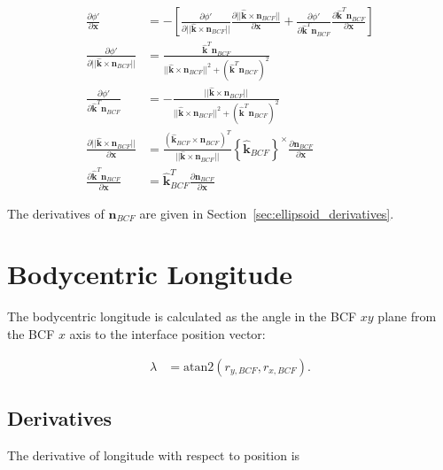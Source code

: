\documentclass[]{article}
\newcommand{\vb}[1]{\bm{#1}} %
\newcommand{\vbh}[1]{\hat{\bm{#1}}} %
\newcommand{\pd}[2]{\frac{\partial #1}{\partial #2}} %
\newcommand{\crossmat}[1]{\left\{ {#1} \right\}^{\times}} %
\begin{document}
\begin{align}
	\pd{\phi'}{\vb{x}} &= - \left[ \pd{\phi'}{|| \vbh{k} \times \vb{n}_{BCF} ||} \pd{|| \vbh{k} \times \vb{n}_{BCF} ||}{\vb{x}} + \pd{\phi'}{\vbh{k}^T \vb{n}_{BCF}} \pd{\vbh{k}^T \vb{n}_{BCF}}{\vb{x}} \right] \\
	\pd{\phi'}{|| \vbh{k} \times \vb{n}_{BCF} ||} &= \frac{\vbh{k}^T \vb{n}_{BCF}}{|| \vbh{k} \times \vb{n}_{BCF} ||^2 + \left( \vbh{k}^T \vb{n}_{BCF} \right)^2} \\
	\pd{\phi'}{\vbh{k}^T \vb{n}_{BCF}} &= - \frac{|| \vbh{k} \times \vb{n}_{BCF} ||}{|| \vbh{k} \times \vb{n}_{BCF} ||^2 + \left( \vbh{k}^T \vb{n}_{BCF} \right)^2} \\
	\pd{|| \vbh{k} \times \vb{n}_{BCF} ||}{\vb{x}} &= \frac{\left( \vbh{k}_{BCF} \times \vb{n}_{BCF} \right)^T}{|| \vbh{k} \times \vb{n}_{BCF} ||} \crossmat{\vbh{k}_{BCF}} \pd{\vb{n}_{BCF}}{\vb{x}} \\
	\pd{\vbh{k}^T \vb{n}_{BCF}}{\vb{x}} &= \vbh{k}_{BCF}^T \pd{\vb{n}_{BCF}}{\vb{x}}
\end{align}

The derivatives of $\vb{n}_{BCF}$ are given in Section~\ref{sec:ellipsoid_derivatives}.

\section{Bodycentric Longitude}


The bodycentric longitude is calculated as the angle in the BCF $xy$ plane from the BCF $x$ axis to the interface position vector:

\begin{align}
	\lambda &= \mathrm{atan2} \left(r_{y, BCF}, r_{x, BCF} \right).
\end{align}

\subsection{Derivatives}
\label{sec:lat_bodycentric_derivs}

The derivative of longitude with respect to position is
\end{document}
